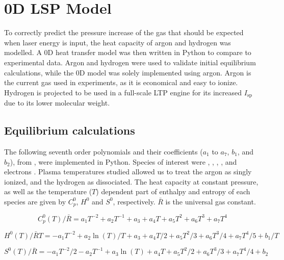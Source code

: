 \chapter{0D LSP Model} \label{chp:models}

    To correctly predict the pressure increase of the gas that should be expected when laser energy is input, the heat capacity of argon and hydrogen was modelled. A 0D heat transfer model was then written in Python to compare to experimental data. Argon and hydrogen were used to validate initial equilibrium calculations, while the 0D model was solely implemented using argon. Argon is the current gas used in experiments, as it is economical and easy to ionize. Hydrogen is projected to be used in a full-scale LTP engine for its increased $I_\mathrm{sp}$ due to its lower molecular weight.

    \section{Equilibrium calculations} \label{sec:equilibrium calcs}
        
        The following seventh order polynomials and their coefficients ($a_1$ to $a_7$, $b_1$, and $b_2$), from \textcite{mcbrideNASAGlennCoefficients2002}, were implemented in Python. Species of interest were , , , , and electrons . Plasma temperatures studied allowed us to treat the argon as singly ionized, and the hydrogen as dissociated. The heat capacity at constant pressure, as well as the temperature ($T$) dependent part of enthalpy and entropy of each species are given by $C_p^0$, $H^0$ and $S^0$, respectively. $\bar R$ is the universal gas constant.

        \begin{equation}
            C_p^0 (T)/\bar R = a_1 T^{-2} + a_2 T^{-1} + a_3 + a_4   T + a_5 T^2 + a_6 T^3 + a_7 T^4
        \end{equation} 
        
        \begin{equation}
            H^0 (T)/\bar RT = -a_1 T^{-2} + a_2 \ln(T)/T + a_3 + a_4 T / 2 + a_5 {T^2}/3 + a_6 {T^3}/4 + a_7 {T^4}/5 + b_1/T
        \end{equation}
        
        \begin{equation}
            S^0(T)/\bar R = -a_1 T^{-2}/2 - a_2 T^{-1} + a_3\ln(T) + a_4   T + a_5 {T^2}/2 + a_6 T^3/3 + a_7 T^4/4 + b_2
        \end{equation}

